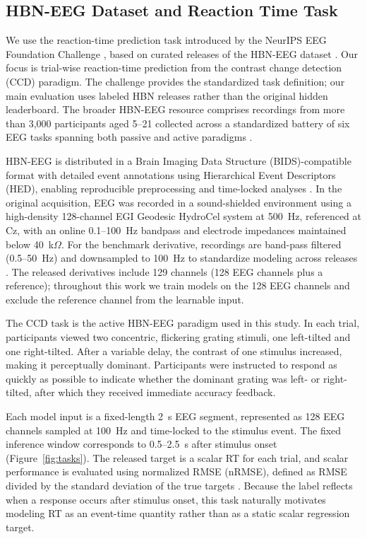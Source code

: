 \documentclass[12pt]{article}
\begin{document}
\subsection{HBN-EEG Dataset and Reaction Time Task}

We use the reaction-time prediction task introduced by the NeurIPS EEG Foundation Challenge \citep{EEGChallengeWebsite2025,EEGFoundationChallengeArxiv2025}, based on curated releases of the HBN-EEG dataset \citep{Shirazi2024HBNEEG}. Our focus is trial-wise reaction-time prediction from the contrast change detection (CCD) paradigm. The challenge provides the standardized task definition; our main evaluation uses labeled HBN releases rather than the original hidden leaderboard. The broader HBN-EEG resource comprises recordings from more than 3{,}000 participants aged 5--21 collected across a standardized battery of six EEG tasks spanning both passive and active paradigms \citep{Shirazi2024HBNEEG,EEGChallengeWebsite2025}.

HBN-EEG is distributed in a Brain Imaging Data Structure (BIDS)-compatible format with detailed event annotations using Hierarchical Event Descriptors (HED), enabling reproducible preprocessing and time-locked analyses \citep{Shirazi2024HBNEEG}. In the original acquisition, EEG was recorded in a sound-shielded environment using a high-density 128-channel EGI Geodesic HydroCel system at 500~Hz, referenced at Cz, with an online 0.1--100~Hz bandpass and electrode impedances maintained below 40~k$\Omega$. For the benchmark derivative, recordings are band-pass filtered (0.5--50~Hz) and downsampled to 100~Hz to standardize modeling across releases \citep{EEGChallengeWebsite2025}. The released derivatives include 129 channels (128 EEG channels plus a reference); throughout this work we train models on the 128 EEG channels and exclude the reference channel from the learnable input.

The CCD task is the active HBN-EEG paradigm used in this study. In each trial, participants viewed two concentric, flickering grating stimuli, one left-tilted and one right-tilted. After a variable delay, the contrast of one stimulus increased, making it perceptually dominant. Participants were instructed to respond as quickly as possible to indicate whether the dominant grating was left- or right-tilted, after which they received immediate accuracy feedback.

Each model input is a fixed-length 2~s EEG segment, represented as 128 EEG channels sampled at 100~Hz and time-locked to the stimulus event. The fixed inference window corresponds to 0.5--2.5~s after stimulus onset (Figure~\ref{fig:tasks}). The released target is a scalar RT for each trial, and scalar performance is evaluated using normalized RMSE (nRMSE), defined as RMSE divided by the standard deviation of the true targets \citep{EEGChallengeWebsite2025}. Because the label reflects when a response occurs after stimulus onset, this task naturally motivates modeling RT as an event-time quantity rather than as a static scalar regression target.
\end{document}
